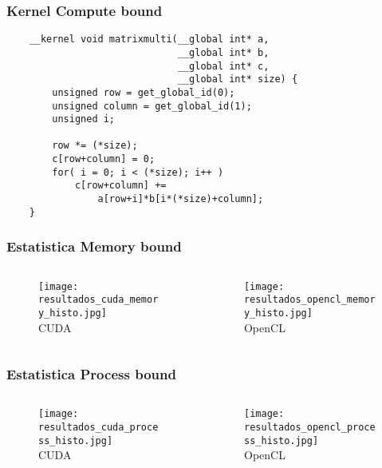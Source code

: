 \documentclass[brazil]{beamer}
\begin{document}

\begin{frame}[fragile]
  \frametitle{Kernel Compute bound}
  \begin{lstlisting}
    __kernel void matrixmulti(__global int* a, 
                              __global int* b, 
                              __global int* c, 
                              __global int* size) {
        unsigned row = get_global_id(0);
        unsigned column = get_global_id(1);
        unsigned i;
        
        row *= (*size);
        c[row+column] = 0;
        for( i = 0; i < (*size); i++ ) 
            c[row+column] += 
                a[row+i]*b[i*(*size)+column];
    }
  \end{lstlisting}
\end{frame}

\begin{frame}[fragile]
  \frametitle{Estatistica Memory bound}
  \begin{columns}
    \begin{column}{.5\textwidth}
      \begin{figure}
          \texttt{[image: resultados\_cuda\_memory\_histo.jpg]} \\
          CUDA
      \end{figure}
    \end{column}
    \begin{column}{.5\textwidth}
      \begin{figure}
          \texttt{[image: resultados\_opencl\_memory\_histo.jpg]} \\
          OpenCL
      \end{figure}
    \end{column}
  \end{columns}
\end{frame}

\begin{frame}[fragile]
  \frametitle{Estatistica Process bound}
  \begin{columns}
    \begin{column}{.5\textwidth}
      \begin{figure}
          \texttt{[image: resultados\_cuda\_process\_histo.jpg]} \\
          CUDA        
      \end{figure}
    \end{column}
    \begin{column}{.5\textwidth}
      \begin{figure}
          \texttt{[image: resultados\_opencl\_process\_histo.jpg]} \\
          OpenCL
      \end{figure}
    \end{column}
  \end{columns}
\end{frame}
\end{document}
